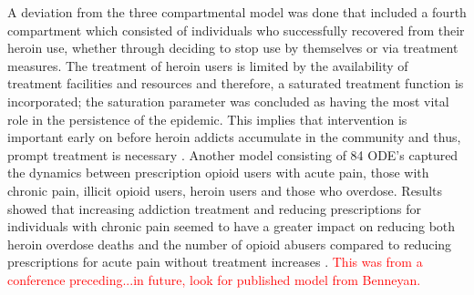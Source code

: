 \documentclass[12pt]{article}
\begin{document}
A deviation from the three compartmental model was done that included a fourth compartment which consisted of individuals who successfully recovered from their heroin use, whether through deciding to stop use by themselves or via treatment measures. The treatment of heroin users is limited by the availability of treatment facilities and resources and therefore, a saturated treatment function is incorporated; the saturation parameter was concluded as having the most vital role in the persistence of the epidemic. This implies that intervention is important early on before heroin addicts accumulate in the community and thus, prompt treatment is necessary \cite{Wangari}. 
Another model consisting of 84 ODE's captured the dynamics between prescription opioid users with acute pain, those with chronic pain, illicit opioid users, heroin users and those who overdose. Results showed that increasing addiction treatment and reducing prescriptions for individuals with chronic pain seemed to have a greater impact on reducing both heroin overdose deaths and the number of opioid abusers compared to reducing prescriptions for acute pain without treatment increases \cite{Benneyan}. \textcolor{red}{This was from a conference preceding...in future, look for published model from Benneyan.} 

\end{document}
